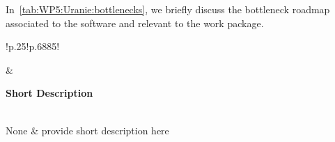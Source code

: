In~\cref{tab:WP5:Uranie:bottlenecks}, we briefly discuss the bottleneck roadmap associated to the software and relevant to the work package.

\begin{table}[h!]
    \centering
    \centering
    { 
        \setlength{\parindent}{0pt}
        \def\arraystretch{1.25}
        {
            \fontsize{9}{11}\selectfont
            \begin{tabular}{!{\color{numpexgray}\vrule}p{.25\linewidth}!{\color{numpexgray}\vrule}p{.6885\linewidth}!{\color{numpexgray}\vrule}}
    
     &  {\rule{0pt}{2.5ex}\color{white}\bf Short Description }\\ 
    
    None & provide short description here \\
\end{tabular}
        }
    }
    \caption{WP5: Uranie plan with Respect to Relevant Bottlenecks}
    \label{tab:WP5:Uranie:bottlenecks}
\end{table}